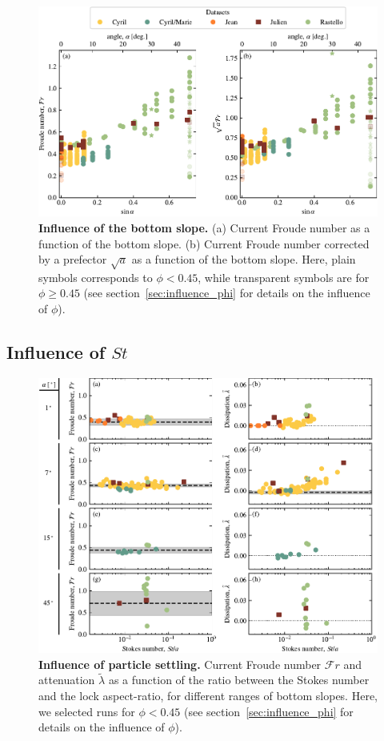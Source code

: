 \documentclass[twocolumn]{article}
\begin{document}
\begin{figure}
	\centering
	\includegraphics{figure4.pdf}
	\caption{\textbf{Influence of the bottom slope.} (a) Current Froude number as a function of the bottom slope. (b) Current Froude number corrected by a prefector $\sqrt{a}$ as a function of the bottom slope. Here, plain symbols corresponds to $\phi < 0.45$, while transparent symbols are for $\phi \geq 0.45$ (see section~\ref{sec:influence_phi} for details on the influence of $\phi$).}
	\label{fig:fig4}
\end{figure}

\subsection{Influence of $St$}

\begin{figure}
	\centering
	\includegraphics{figure5.pdf}
	\caption{\textbf{Influence of particle settling.} Current Froude number $\mathcal{F}r$ and attenuation $\tilde{\lambda}$ as a function of the ratio between the Stokes number and the lock aspect-ratio, for different ranges of bottom slopes. Here, we selected runs for $\phi < 0.45$ (see section~\ref{sec:influence_phi} for details on the influence of $\phi$).}
	\label{fig:fig5}
\end{figure}
\end{document}

